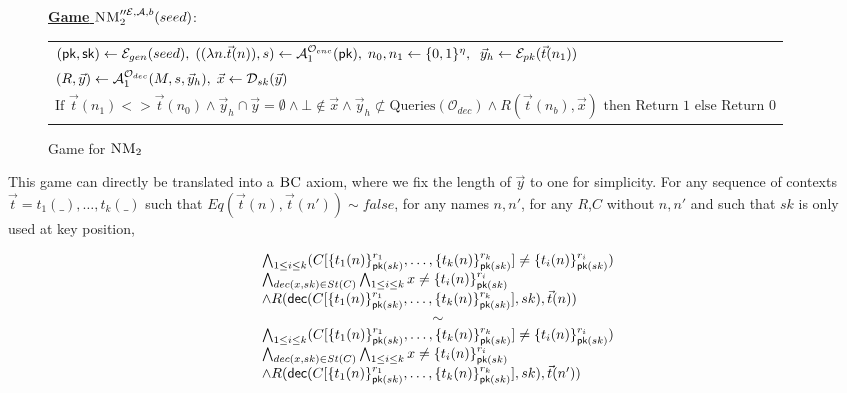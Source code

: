 \begin{figure}[h!]
  \vspace{-1em}
  \centering

        \underline{\textbf{Game}
        $\textsc{NM}_2''^{\mathcal{E},\mathcal{A},b}(seed)$}: \\
        \begin{tabular}{l}
          $(\textsf{pk},\textsf{sk}) \leftarrow \mathcal{E}_{gen}(seed),\; ((\lambda n. \vec{t}(n)),s) \leftarrow \mathcal{A}_1^{\mathcal{O}_{enc}}(\textsf{pk}),\; n_0,n_1\leftarrow \{0,1\}^\eta,\;
  \; \vec{y}_h \leftarrow \mathcal{E}_{pk}(\vec{t}(n_1))$\\
          $(R,\vec{y}) \leftarrow \mathcal{A}_1^{\mathcal{O}_{dec}}(M,s,\vec{y}_h),\; \vec{x} \leftarrow \mathcal{D}_{sk}(\vec{y})$ \\
          $\text{If } \vec{t}(n_1) <> \vec{t}(n_0) \wedge \vec{y}_h \cap \vec{y} = \emptyset \wedge \bot \notin \vec{x} \wedge \vec{y}_h \not \subset \text{Queries}(\mathcal{O}_{dec}) \wedge R(\vec{t}(n_b),\vec{x}) \text{ then Return } 1 \text{ else Return } 0$
        \end{tabular}
  \caption{Game for $\textsc{NM}_2$}
  \label{fig:nmfinal}
\end{figure}

This game can directly be translated into a $\textsc{BC}$ axiom, where we fix the length of $\vec{y}$ to one for simplicity. For any sequence of contexts $\vec{t}=t_1(\_),\ldots,t_k(\_)$ such that $ Eq(\vec{t}(n),\vec{t}(n')) \sim false$, for any names $n, n'$, for any $R$,$C$ without $n,n'$ and such that $sk$ is only used at key position,

\[
  \begin{array}{l}


 \bigwedge_{1 \leq i \leq k}( C[\myenc{t_1(n)}{r_1}{sk},\ldots,\myenc{t_k(n)}{r_k}{sk}] \not = \myenc{t_i(n)}{r_i}{sk} )      \\
 \bigwedge_{ dec(x,sk) \in St(C) }  \bigwedge_{1 \leq i \leq k} x \not = \myenc{t_i(n)}{r_i}{sk} \\
\wedge R( \mydec(C[\myenc{t_1(n)}{r_1}{sk},\ldots,\myenc{t_k(n)}{r_k}{sk}],sk),\vec{t}(n)) \\
\multicolumn{1}{c}{\sim}\\

 \bigwedge_{1 \leq i \leq k}( C[\myenc{t_1(n)}{r_1}{sk},\ldots,\myenc{t_k(n)}{r_k}{sk}] \not = \myenc{t_i(n)}{r_i}{sk} )      \\
 \bigwedge_{ dec(x,sk) \in St(C) }  \bigwedge_{1 \leq i \leq k} x \not = \myenc{t_i(n)}{r_i}{sk} \\
\wedge R( \mydec(C[\myenc{t_1(n)}{r_1}{sk},\ldots,\myenc{t_k(n)}{r_k}{sk}],sk),\vec{t}(n')) \\
  \end{array}
  \]



